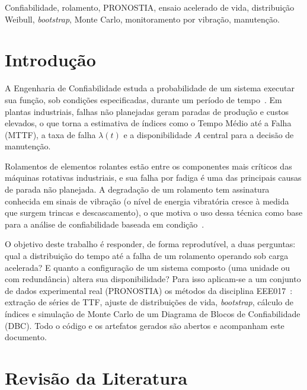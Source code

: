 \documentclass[conference]{IEEEtran}
\begin{document}
\begin{IEEEkeywords}
Confiabilidade, rolamento, PRONOSTIA, ensaio acelerado de vida, distribuição Weibull,
\textit{bootstrap}, Monte Carlo, monitoramento por vibração, manutenção.
\end{IEEEkeywords}

\section{Introdução}

A Engenharia de Confiabilidade estuda a probabilidade de um sistema executar
sua função, sob condições especificadas, durante um período de
tempo~\cite{oconnor2012}. Em plantas industriais, falhas não planejadas geram
paradas de produção e custos elevados, o que torna a estimativa de índices como
o Tempo Médio até a Falha (MTTF), a taxa de falha $\lambda(t)$ e a
disponibilidade $A$ central para a decisão de manutenção.

Rolamentos de elementos rolantes estão entre os componentes mais críticos das
máquinas rotativas industriais, e sua falha por fadiga é uma das principais
causas de parada não planejada. A degradação de um rolamento tem assinatura
conhecida em sinais de vibração (o nível de energia vibratória cresce à medida
que surgem trincas e descascamento), o que motiva o uso dessa técnica como base
para a análise de confiabilidade baseada em condição~\cite{nectoux2012}.

O objetivo deste trabalho é responder, de forma reprodutível, a duas perguntas:
qual a distribuição do tempo até a falha de um rolamento operando sob carga acelerada? E quanto a configuração de um sistema composto (uma unidade ou com redundância) altera sua disponibilidade? Para isso aplicam-se a um conjunto de dados experimental real (PRONOSTIA) os métodos da disciplina EEE017~\cite{bessani2026}: extração
de séries de TTF, ajuste de distribuições de vida, \textit{bootstrap}, cálculo de índices e simulação de Monte Carlo de um Diagrama de Blocos de Confiabilidade (DBC). Todo o código e os artefatos gerados são abertos e acompanham este documento.

\section{Revisão da Literatura}
\label{sec:revisao}
\end{document}
